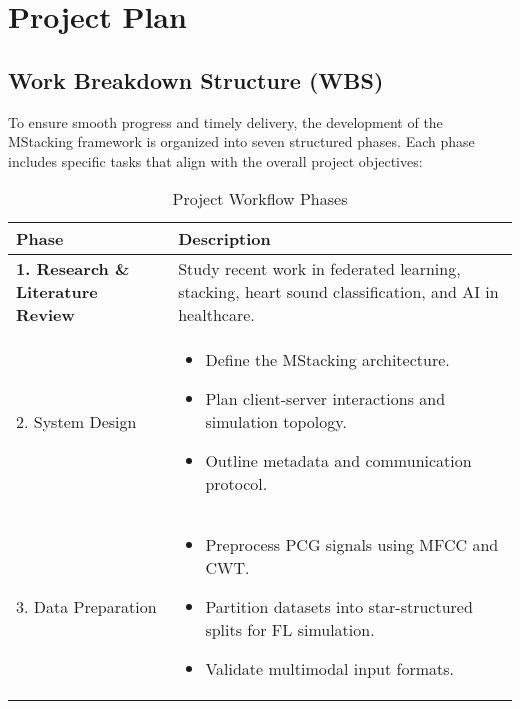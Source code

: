 \chapter {Project Plan}
\section{Work Breakdown Structure (WBS)}
To ensure smooth progress and timely delivery, the development of the MStacking framework is organized into seven structured phases. Each phase includes specific tasks that align with the overall project objectives:

\begin{table}[htbp]
\centering
\caption{Project Workflow Phases}
\label{tab:workflow}
\renewcommand{\arraystretch}{1.5} %
\setlength{\tabcolsep}{6pt} %
\begin{tabular}{|>{\bfseries}l!{\vrule width 1.2pt}p{9.5cm}|}
\hline
{}
\textbf{Phase} & \textbf{Description} \\ \hline

1. Research \& Literature Review & 
Study recent work in federated learning, stacking, heart sound classification, and AI in healthcare. \\ \hline

2. System Design & 
\vspace{-4mm}\begin{itemize}[leftmargin=*,nosep]
\item Define the MStacking architecture.
\item Plan client-server interactions and simulation topology.
\item Outline metadata and communication protocol.
\end{itemize} \\ \hline

3. Data Preparation & 
\vspace{-4mm}\begin{itemize}[leftmargin=*,nosep]
\item Preprocess PCG signals using MFCC and CWT.
\item Partition datasets into star-structured splits for FL simulation.
\item Validate multimodal input formats.
\end{itemize} \\ \hline


\end{tabular}
\end{table}
